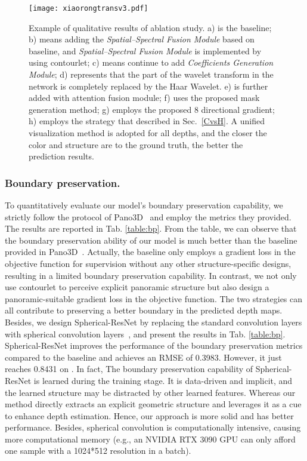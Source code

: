 \documentclass[10pt,times,mathptm,psfig,twocolumn,journals]{IEEEtran}
\begin{document}
\begin{figure*}[t]
\centering
\texttt{[image: xiaorongtransv3.pdf]}
\caption{Example of qualitative results of ablation study. a) is the baseline; b) means adding the \textit{Spatial–Spectral Fusion Module}  based on baseline, and \textit{Spatial–Spectral Fusion Module} is implemented by using contourlet; c) means continue to add \textit{Coefficients Generation Module}; d) represents that the part of the wavelet transform in the network is completely replaced by the Haar Wavelet. e) is further added with attention fusion module; f) uses the proposed mask generation method; g) employs the proposed 8 directional gradient; h) employs the strategy that described in Sec.~\ref{CvsH}. A unified visualization method is adopted for all depths, and the closer the color and structure are to the ground truth, the better the prediction results.}
\label{fig:abla}
\end{figure*}
\subsubsection{Boundary preservation.}
To quantitatively evaluate our model's boundary preservation capability, we strictly follow the protocol of Pano3D~\cite{albanis2021pano3d} and employ the metrics they provided. The results are reported in Tab. \ref{table:bp}. From the table, we can observe that the boundary preservation ability of our model is much better than the baseline provided in Pano3D~\cite{albanis2021pano3d}. Actually, the baseline only employs a gradient loss in the objective function for supervision without any other structure-specific designs, resulting in a limited boundary preservation capability. In contrast, we not only use contourlet to perceive explicit panoramic structure but also design a panoramic-suitable gradient loss in the objective function. The two strategies can all contribute to preserving a better boundary in the predicted depth maps. 
Besides, we design Spherical-ResNet by replacing the standard convolution layers with spherical convolution layers~\cite{cohen2018spherical}, and present the results in Tab. \ref{table:bp}. Spherical-ResNet improves the performance of the boundary preservation metrics compared to the baseline and achieves an RMSE of 0.3983. However, it just reaches 0.8431 on . In fact, The boundary preservation capability of Spherical-ResNet is learned during the training stage. It is data-driven and implicit, and the learned structure may be distracted by other learned features. Whereas our method directly extracts an explicit geometric structure and leverages it as a cue to enhance depth estimation. Hence, our approach is more solid and has better performance. Besides, spherical convolution is computationally intensive, causing more computational memory (e.g., an NVIDIA RTX 3090 GPU can only afford one sample with a 1024*512 resolution in a batch).
\end{document}
